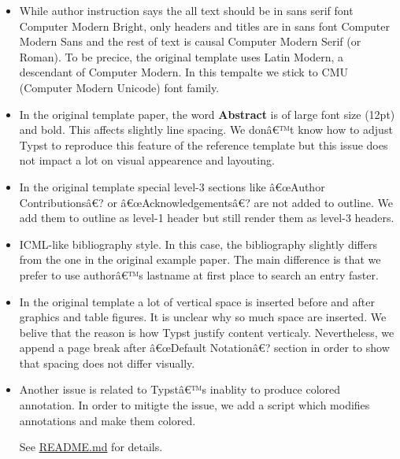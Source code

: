 \begin{itemize}
\item
  While author instruction says the all text should be in sans serif
  font Computer Modern Bright, only headers and titles are in sans font
  Computer Modern Sans and the rest of text is causal Computer Modern
  Serif (or Roman). To be precice, the original template uses Latin
  Modern, a descendant of Computer Modern. In this tempalte we stick to
  CMU (Computer Modern Unicode) font family.
\item
  In the original template paper, the word \textbf{Abstract} is of large
  font size (12pt) and bold. This affects slightly line spacing. We
  donâ€™t know how to adjust Typst to reproduce this feature of the
  reference template but this issue does not impact a lot on visual
  appearence and layouting.
\item
  In the original template special level-3 sections like â€œAuthor
  Contributionsâ€? or â€œAcknowledgementsâ€? are not added to outline.
  We add them to outline as level-1 header but still render them as
  level-3 headers.
\item
  ICML-like bibliography style. In this case, the bibliography slightly
  differs from the one in the original example paper. The main
  difference is that we prefer to use authorâ€™s lastname at first place
  to search an entry faster.
\item
  In the original template a lot of vertical space is inserted before
  and after graphics and table figures. It is unclear why so much space
  are inserted. We belive that the reason is how Typst justify content
  verticaly. Nevertheless, we append a page break after â€œDefault
  Notationâ€? section in order to show that spacing does not differ
  visually.
\item
  Another issue is related to Typstâ€™s inablity to produce colored
  annotation. In order to mitigte the issue, we add a script which
  modifies annotations and make them colored.

\begin{Shaded}
\begin{Highlighting}[]
\end{Highlighting}
\end{Shaded}

  See
  \href{https://github.com/daskol/typst-templates/\#colored-annotations}{README.md}
  for details.
\end{itemize}

